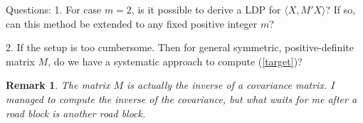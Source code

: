 \documentclass[10pt]{article}
\newtheorem{remark}{\bf Remark}
\newenvironment{Proof of lemma}{\noindent{\bf Proof of Lemma}}{\hfill$\Box$\newline}
\newenvironment{Proof of claim}{\noindent{\bf Proof of claim}}{\hfill$\Box$\newline}
\newenvironment{Proof of theorem}{\noindent{\bf Proof of Theorem}}{\hfill\scriptsize{$\Box$}\newline}
\newenvironment{Proof of theorems}{\noindent{\bf Proof of Theorems}}{\hfill$\Box$\newline}
\newenvironment{Proof of proposition}{\noindent{\bf Proof of Proposition}}{\hfill$\Box$\newline}
\newenvironment{Proof of propositions}{\noindent{\bf Proof of Propositions}}{\hfill$\Box$\newline}
\newenvironment{Proof of exercise}{\noindent{\it Proof of Exercise:}}{\hfill$\Box$}
\begin{document}
Questions:
1. For case $m=2$, is it possible to derive a LDP for $\langle X, M'X \rangle$? If so, can this method be extended to any fixed positive integer $m$?

2. If the setup is too cumbersome. Then for general symmetric, positive-definite matrix $M$, do we have a systematic approach to compute (\ref{target})?

\begin{remark}
    The matrix $M$ is actually the inverse of a covariance matrix. I managed to compute the inverse of the covariance, but what waits for me after a road block is another road block.
\end{remark}
\end{document}
